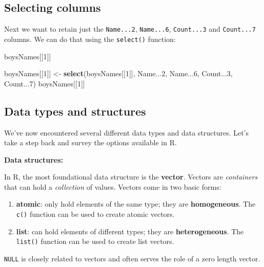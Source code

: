 \documentclass[
]{book}
\newenvironment{Shaded}{\begin{snugshade}}{\end{snugshade}}
\newcommand{\DecValTok}[1]{\textcolor[rgb]{0.00,0.00,0.81}{#1}}
\newcommand{\KeywordTok}[1]{\textcolor[rgb]{0.13,0.29,0.53}{\textbf{#1}}}
\newcommand{\NormalTok}[1]{#1}
\newcommand{\StringTok}[1]{\textcolor[rgb]{0.31,0.60,0.02}{#1}}
\providecommand{\tightlist}{%
  \setlength{\itemsep}{0pt}\setlength{\parskip}{0pt}}
\begin{document}
\hypertarget{selecting-columns}{%
\subsection{Selecting columns}\label{selecting-columns}}

Next we want to retain just the \texttt{Name...2}, \texttt{Name...6}, \texttt{Count...3} and \texttt{Count...7} columns.
We can do that using the \texttt{select()} function:

\begin{Shaded}
\begin{Highlighting}[]
\NormalTok{boysNames[[}\DecValTok{1}\NormalTok{]]}

\NormalTok{boysNames[[}\DecValTok{1}\NormalTok{]] <-}\StringTok{ }\KeywordTok{select}\NormalTok{(boysNames[[}\DecValTok{1}\NormalTok{]], Name...}\DecValTok{2}\NormalTok{, Name...}\DecValTok{6}\NormalTok{, Count...}\DecValTok{3}\NormalTok{, Count...}\DecValTok{7}\NormalTok{)}
\NormalTok{boysNames[[}\DecValTok{1}\NormalTok{]]}
\end{Highlighting}
\end{Shaded}

\hypertarget{data-types-and-structures}{%
\subsection{Data types and structures}\label{data-types-and-structures}}

We've now encountered several different data types and data structures. Let's take a step back and survey the options available in R.

\textbf{Data structures:}

In R, the most foundational data structure is the \textbf{vector}. Vectors are \emph{containers} that
can hold a \emph{collection} of values. Vectors come in two basic forms:

\begin{enumerate}
\def\labelenumi{\arabic{enumi}.}
\tightlist
\item
  \textbf{atomic}: only hold elements of the same type; they are \textbf{homogeneous}. The \texttt{c()} function can be used to create atomic vectors.
\item
  \textbf{list}: can hold elements of different types; they are \textbf{heterogeneous}. The \texttt{list()} function can be used to create list vectors.
\end{enumerate}

\texttt{NULL} is closely related to vectors and often serves the role of a zero length vector.
\end{document}
